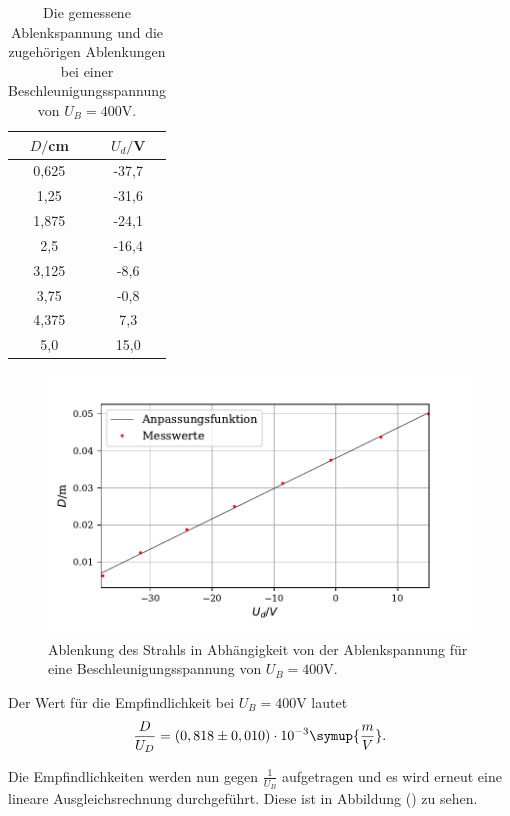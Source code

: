 \begin{table}[H]
  \centering
  \caption{Die gemessene Ablenkspannung und die zugehörigen Ablenkungen bei einer Beschleunigungsspannung von $U_B = 400 \si{\volt}$.}
  \label{tab:Parameter}
  \begin{tabular}{c c}
    \toprule
    $D/$cm& $U_d/$V \\
    \bottomrule
     0,625 & -37,7 \\
     1,25 & -31,6 \\
     1,875 & -24,1  \\
     2,5 & -16,4 \\
     3,125 & -8,6  \\
     3,75& -0,8 \\
     4,375 & 7,3  \\
     5,0 &  15,0 \\
     \bottomrule
  \end{tabular}
\end{table}

\begin{figure}[H]
  \centering
  \includegraphics{plot7.pdf}
  \caption{Ablenkung des Strahls in Abhängigkeit von der Ablenkspannung für eine Beschleunigungsspannung von $U_B = 400 \si{\volt}$. }
  \label{fig:plot}
\end{figure}

Der Wert für die Empfindlichkeit bei $U_B = 400 \si{\volt}$ lautet
\begin{align*}
\frac{D}{U_D} = (0,818 \pm 0,010) \cdot 10^{-3} \symup{\frac{m}{V}} .
\end{align*}

\noindent Die Empfindlichkeiten werden nun gegen $\frac{1}{U_B}$ aufgetragen und es wird erneut eine lineare Ausgleichsrechnung durchgeführt. Diese ist in Abbildung () zu sehen.

